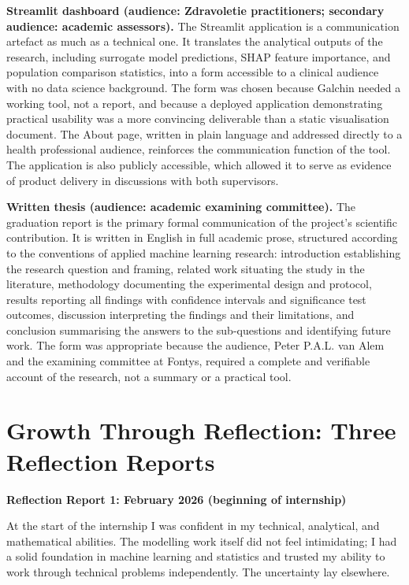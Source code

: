 \documentclass[11pt,a4paper]{report}
\begin{document}
\textbf{Streamlit dashboard (audience: Zdravoletie practitioners; secondary audience: academic
assessors).} The Streamlit application is a communication artefact as much as a technical one. It
translates the analytical outputs of the research, including surrogate model predictions, SHAP
feature importance, and population comparison statistics, into a form accessible to a clinical
audience with no data science background. The form was chosen because Galchin needed a working
tool, not a report, and because a deployed application demonstrating practical usability was a more
convincing deliverable than a static visualisation document. The About page, written in plain
language and addressed directly to a health professional audience, reinforces the communication
function of the tool. The application is also publicly accessible, which allowed it to serve as
evidence of product delivery in discussions with both supervisors.

\textbf{Written thesis (audience: academic examining committee).} The graduation report is the
primary formal communication of the project's scientific contribution. It is written in English in
full academic prose, structured according to the conventions of applied machine learning research:
introduction establishing the research question and framing, related work situating the study in
the literature, methodology documenting the experimental design and protocol, results reporting all
findings with confidence intervals and significance test outcomes, discussion interpreting the
findings and their limitations, and conclusion summarising the answers to the sub-questions and
identifying future work. The form was appropriate because the audience, Peter P.A.L. van Alem and the
examining committee at Fontys, required a complete and verifiable account of the research, not a
summary or a practical tool.

\section{Growth Through Reflection: Three Reflection Reports}

\textbf{Reflection Report 1: February 2026 (beginning of internship)}

At the start of the internship I was confident in my technical, analytical, and mathematical
abilities. The modelling work itself did not feel intimidating; I had a solid foundation in machine
learning and statistics and trusted my ability to work through technical problems independently.
The uncertainty lay elsewhere.
\end{document}
